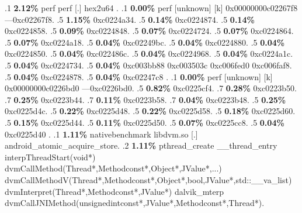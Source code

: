 \begin{profile}
{.1 \textbf{ 2.12\%} perf             perf                   [.] hex2u64\newline {} . 
.1 \textbf{ 0.00\%} perf             [unknown]              [k] 0x00000000c02267f8\newline {} ---0xc02267f8. 
.5 \textbf{1.15\%} 0xc0224a34. 
.5 \textbf{0.14\%} 0xc0224874. 
.5 \textbf{0.14\%} 0xc0224858. 
.5 \textbf{0.09\%} 0xc0224848. 
.5 \textbf{0.07\%} 0xc0224724. 
.5 \textbf{0.07\%} 0xc0224864. 
.5 \textbf{0.07\%} 0xc0224a18. 
.5 \textbf{0.04\%} 0xc02249bc. 
.5 \textbf{0.04\%} 0xc0224880. 
.5 \textbf{0.04\%} 0xc0224850. 
.5 \textbf{0.04\%} 0xc022486c. 
.5 \textbf{0.04\%} 0xc0224968. 
.5 \textbf{0.04\%} 0xc0224a1c. 
.5 \textbf{0.04\%} 0xc0224734. 
.5 \textbf{0.04\%} 0xc003bb88\newline {} 0xc003503c\newline {} 0xc006fed0\newline {} 0xc006faf8. 
.5 \textbf{0.04\%} 0xc0224878. 
.5 \textbf{0.04\%} 0xc02247c8\newline {} . 
.1 \textbf{ 0.00\%} perf             [unknown]              [k] 0x00000000c0226bd0\newline {} ---0xc0226bd0. 
.5 \textbf{0.82\%} 0xc0225cf4. 
.7 \textbf{0.28\%} 0xc0223b50. 
.7 \textbf{0.25\%} 0xc0223b44. 
.7 \textbf{0.11\%} 0xc0223b58. 
.7 \textbf{0.04\%} 0xc0223b48. 
.5 \textbf{0.25\%} 0xc0225d4c. 
.5 \textbf{0.22\%} 0xc0225d48. 
.5 \textbf{0.22\%} 0xc0225d58. 
.5 \textbf{0.18\%} 0xc0225d60. 
.5 \textbf{0.15\%} 0xc0225d44. 
.5 \textbf{0.11\%} 0xc0225d50. 
.5 \textbf{0.07\%} 0xc0225cc8. 
.5 \textbf{0.04\%} 0xc0225d40\newline {} . 
.1 \textbf{ 1.11\%} nativebenchmark  libdvm.so              [.] android\_atomic\_acquire\_store. 
.2 \textbf{1.11\%} pthread\_create\newline {} \_\_thread\_entry\newline {} interpThreadStart(void*)\newline {} dvmCallMethod(Thread*,Methodconst*,Object*,JValue*,...)\newline {} dvmCallMethodV(Thread*,Methodconst*,Object*,bool,JValue*,std::\_\_va\_list)\newline {} dvmInterpret(Thread*,Methodconst*,JValue*)\newline {} dalvik\_mterp\newline {} dvmCallJNIMethod(unsignedintconst*,JValue*,Methodconst*,Thread*). 
}
\end{profile}
